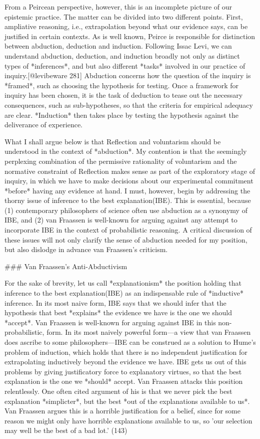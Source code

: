 From a Peircean perspective, however, this is an incomplete picture of
our epistemic practice. The matter can be divided into two different
points. First, ampliative reasoning, i.e., extrapolation beyond what our
evidence says, can be justified in certain contexts. As is well known,
Peirce is responsible for distinction between abduction, deduction and
induction. Following Issac Levi, we can understand abduction, deduction,
and induction broadly not only as distinct types of *inferences*, and
but also different *tasks* involved in our practice of
inquiry.{[}@levibeware 281{]} Abduction concerns how the question of the
inquiry is *framed*, such as choosing the hypothesis for testing. Once a
framework for inquiry has been chosen, it is the task of deduction to
tease out the necessary consequences, such as sub-hypotheses, so that
the criteria for empirical adequacy are clear. *Induction* then takes
place by testing the hypothesis against the deliverance of experience.

What I shall argue below is that Reflection and voluntarism should be
understood in the context of *abduction*. My contention is that the
seemingly perplexing combination of the permissive rationality of
voluntarism and the normative constraint of Reflection makes sense as
part of the exploratory stage of inquiry, in which we have to make
decisions about our experimental commitment *before* having any evidence
at hand. I must, however, begin by addressing the thorny issue of
inference to the best explanation(IBE). This is essential, because (1)
contemporary philosophers of science often use abduction as a synonymy
of IBE, and (2) van Fraassen is well-known for arguing against any
attempt to incorporate IBE in the context of probabilistic reasoning. A
critical discussion of these issues will not only clarify the sense of
abduction needed for my position, but also dislodge in advance van
Fraassen's criticism.

\#\#\# Van Fraassen's Anti-Abductivism

For the sake of brevity, let us call *explanationism* the position
holding that inference to the best explanation(IBE) as an indispensable
rule of *inductive* inference. In its most naive form, IBE says that we
should infer that the hypothesis that best *explains* the evidence we
have is the one we should *accept*. Van Fraassen is well-known for
arguing against IBE in this non-probabilistic, form. In its most naively
powerful form---a view that van Fraassen does ascribe to some
philosophers---IBE can be construed as a solution to Hume's problem of
induction, which holds that there is no independent justification for
extrapolating inductively beyond the evidence we have. IBE gets us out
of this problems by giving justificatory force to explanatory virtues,
so that the best explanation is the one we *should* accept. Van Fraassen
attacks this position relentlessly. One often cited argument of his is
that we never pick the best explanation *simplicter*, but the best *out
of the explanations available to us*. Van Fraassen argues this is a
horrible justification for a belief, since for some reason we might only
have horrible explanations available to us, so 'our selection may well
be the best of a bad lot.' (143)

